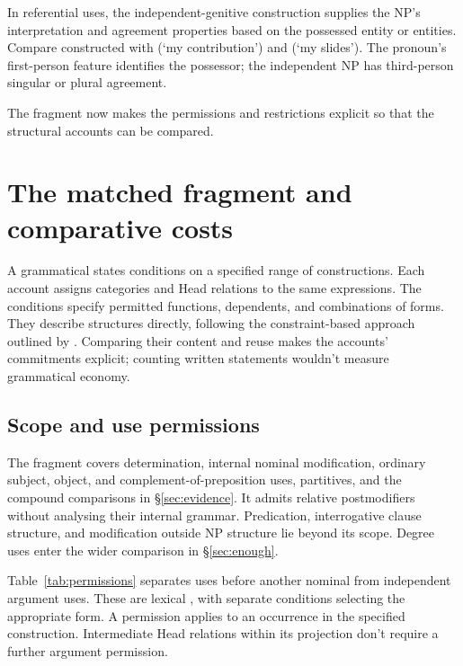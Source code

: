 \documentclass[12pt]{article}
\begin{document}
In referential uses, the independent-genitive construction supplies the NP's interpretation and agreement properties based on the possessed entity or entities. Compare constructed  with  (\enquote*{my contribution}) and  (\enquote*{my slides}). The pronoun's first-person feature identifies the possessor; the independent NP has third-person singular or plural agreement.

The fragment now makes the permissions and restrictions explicit so that the structural accounts can be compared.

\section{The matched fragment and comparative costs}\label{sec:economy}

A grammatical  states conditions on a specified range of constructions. Each account assigns categories and Head relations to the same expressions. The conditions specify permitted functions, dependents, and combinations of forms. They describe structures directly, following the constraint-based approach outlined by \textcite{pullum2020theorizing}. Comparing their content and reuse makes the accounts' commitments explicit; counting written statements wouldn't measure grammatical economy.

\subsection{Scope and use permissions}\label{sec:fragment}

The fragment covers determination, internal nominal modification, ordinary subject, object, and complement-of-preposition uses, partitives, and the compound comparisons in §\ref{sec:evidence}. It admits relative postmodifiers without analysing their internal grammar. Predication, interrogative clause structure, and modification outside NP structure lie beyond its scope. Degree uses enter the wider comparison in §\ref{sec:enough}.

Table~\ref{tab:permissions} separates uses before another nominal from independent argument uses. These are lexical , with separate conditions selecting the appropriate form. A permission applies to an occurrence in the specified construction. Intermediate Head relations within its projection don't require a further argument permission.
\end{document}
